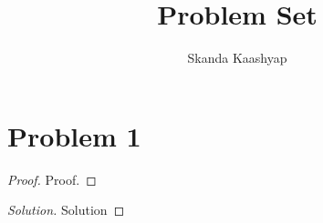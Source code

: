 \documentclass[12pt]{article}
\title{Problem Set}
\author{Skanda Kaashyap}
\date{}
\newenvironment{solution}
  {\renewcommand\qedsymbol{$\blacksquare$}\begin{proof}[Solution]}
  {\end{proof}}
\begin{document}
\maketitle

\section*{Problem 1}
	\begin{proof}
		Proof.
	\end{proof}

	\begin{solution}
	Solution
	\end{solution}
\end{document}
